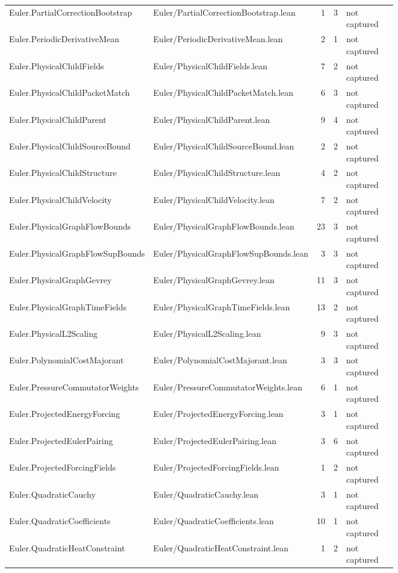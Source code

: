 \documentclass[10pt]{article}
\begin{document}
\begin{longtable}{p{0.28\linewidth}p{0.27\linewidth}r r p{0.20\linewidth}}
Euler.PartialCorrectionBootstrap & Euler/PartialCorrectionBootstrap.lean & 1 & 3 & not captured\\
Euler.PeriodicDerivativeMean & Euler/PeriodicDerivativeMean.lean & 2 & 1 & not captured\\
Euler.PhysicalChildFields & Euler/PhysicalChildFields.lean & 7 & 2 & not captured\\
Euler.PhysicalChildPacketMatch & Euler/PhysicalChildPacketMatch.lean & 6 & 3 & not captured\\
Euler.PhysicalChildParent & Euler/PhysicalChildParent.lean & 9 & 4 & not captured\\
Euler.PhysicalChildSourceBound & Euler/PhysicalChildSourceBound.lean & 2 & 2 & not captured\\
Euler.PhysicalChildStructure & Euler/PhysicalChildStructure.lean & 4 & 2 & not captured\\
Euler.PhysicalChildVelocity & Euler/PhysicalChildVelocity.lean & 7 & 2 & not captured\\
Euler.PhysicalGraphFlowBounds & Euler/PhysicalGraphFlowBounds.lean & 23 & 3 & not captured\\
Euler.PhysicalGraphFlowSupBounds & Euler/PhysicalGraphFlowSupBounds.lean & 3 & 3 & not captured\\
Euler.PhysicalGraphGevrey & Euler/PhysicalGraphGevrey.lean & 11 & 3 & not captured\\
Euler.PhysicalGraphTimeFields & Euler/PhysicalGraphTimeFields.lean & 13 & 2 & not captured\\
Euler.PhysicalL2Scaling & Euler/PhysicalL2Scaling.lean & 9 & 3 & not captured\\
Euler.PolynomialCostMajorant & Euler/PolynomialCostMajorant.lean & 3 & 3 & not captured\\
Euler.PressureCommutatorWeights & Euler/PressureCommutatorWeights.lean & 6 & 1 & not captured\\
Euler.ProjectedEnergyForcing & Euler/ProjectedEnergyForcing.lean & 3 & 1 & not captured\\
Euler.ProjectedEulerPairing & Euler/ProjectedEulerPairing.lean & 3 & 6 & not captured\\
Euler.ProjectedForcingFields & Euler/ProjectedForcingFields.lean & 1 & 2 & not captured\\
Euler.QuadraticCauchy & Euler/QuadraticCauchy.lean & 3 & 1 & not captured\\
Euler.QuadraticCoefficients & Euler/QuadraticCoefficients.lean & 10 & 1 & not captured\\
Euler.QuadraticHeatConstraint & Euler/QuadraticHeatConstraint.lean & 1 & 2 & not captured\\

\end{longtable}
\end{document}
